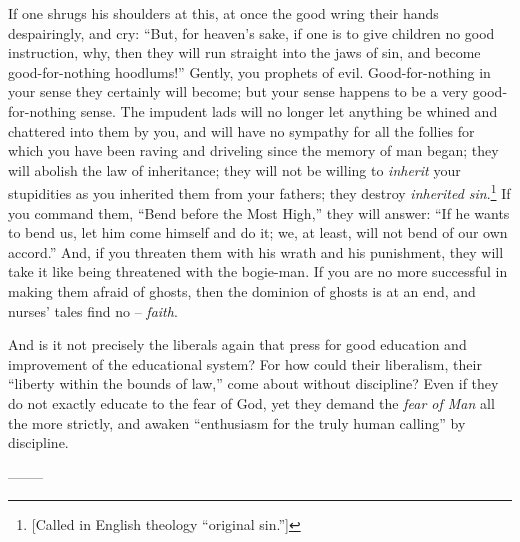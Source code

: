 \documentclass[12pt,a4paper]{book}
\begin{document}
If one shrugs his shoulders at this, at once the good wring their hands 
despairingly, and cry: ``But, for heaven's sake, if one is to give children 
no good instruction, why, then they will run straight into the jaws of sin, 
and become good-for-nothing hoodlums!'' Gently, you prophets of evil. 
Good-for-nothing in your sense they certainly will become; but your sense 
happens to be a very good-for-nothing sense. The impudent lads will no longer 
let anything be whined and chattered into them by you, and will have no 
sympathy for all the follies for which you have been raving and driveling 
since the memory of man began; they will abolish the law of inheritance; they 
will not be willing to \textit{inherit} your stupidities as you inherited them 
from your fathers; they destroy \textit{inherited sin}.\footnote{[Called in 
English theology ``original sin.'']} If you command them, ``Bend before the 
Most High,'' they will answer: ``If he wants to bend us, let him come 
himself and do it; we, at least, will not bend of our own accord.'' And, if 
you threaten them with his wrath and his punishment, they will take it like 
being threatened with the bogie-man. If you are no more successful in making 
them afraid of ghosts, then the dominion of ghosts is at an end, and nurses' 
tales find no -- \textit{faith}.

And is it not precisely the liberals again that press for good education and 
improvement of the educational system? For how could their liberalism, their 
``liberty within the bounds of law,'' come about without discipline? Even if 
they do not exactly educate to the fear of God, yet they demand the 
\textit{fear of Man} all the more strictly, and awaken ``enthusiasm for the 
truly human calling'' by discipline.

\begin{center}
--------\end{center}
\end{document}
